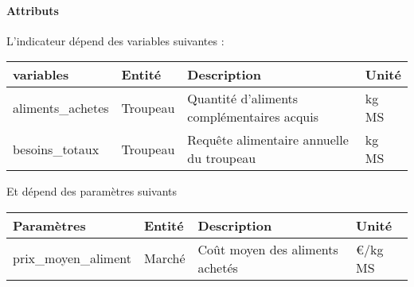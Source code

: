 \documentclass[
]{article}
\begin{document}
\paragraph{Attributs}\label{attributs-21}

L'indicateur dépend des variables suivantes :

\begin{longtable}[]{@{}
  >{\raggedright\arraybackslash}p{}
  >{\raggedright\arraybackslash}p{}
  >{\raggedright\arraybackslash}p{}
  >{\raggedright\arraybackslash}p{}@{}}
\toprule\noalign{}
\begin{minipage}[b]{\linewidth}\raggedright
\textbf{variables}
\end{minipage} & \begin{minipage}[b]{\linewidth}\raggedright
\textbf{Entité}
\end{minipage} & \begin{minipage}[b]{\linewidth}\raggedright
\textbf{Description}
\end{minipage} & \begin{minipage}[b]{\linewidth}\raggedright
\textbf{Unité}
\end{minipage} \\
\midrule\noalign{}
\endhead
\bottomrule\noalign{}
\endlastfoot
aliments\_achetes & Troupeau & Quantité d'aliments complémentaires
acquis & kg MS \\
besoins\_totaux & Troupeau & Requête alimentaire annuelle du troupeau &
kg MS \\
\end{longtable}

Et dépend des paramètres suivants

\begin{longtable}[]{@{}
  >{\raggedright\arraybackslash}p{}
  >{\raggedright\arraybackslash}p{}
  >{\raggedright\arraybackslash}p{}
  >{\raggedright\arraybackslash}p{}@{}}
\toprule\noalign{}
\begin{minipage}[b]{\linewidth}\raggedright
\textbf{Paramètres}
\end{minipage} & \begin{minipage}[b]{\linewidth}\raggedright
\textbf{Entité}
\end{minipage} & \begin{minipage}[b]{\linewidth}\raggedright
\textbf{Description}
\end{minipage} & \begin{minipage}[b]{\linewidth}\raggedright
\textbf{Unité}
\end{minipage} \\
\midrule\noalign{}
\endhead
\bottomrule\noalign{}
\endlastfoot
prix\_moyen\_aliment & Marché & Coût moyen des aliments achetés & €/kg
MS \\
\end{longtable}
\end{document}
